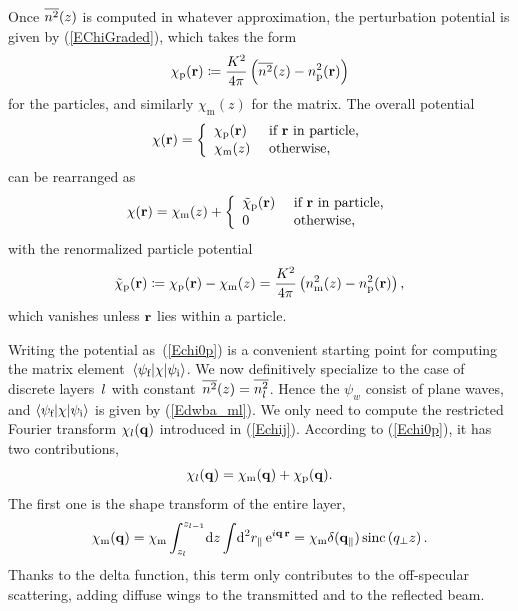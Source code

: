 Once $\overline{n^2}(z)$ is computed in whatever approximation,
the perturbation potential is given by (\ref{EChiGraded}),
which takes the form
\begin{equation}
  \chi_\text{p}(\mathbf{r}) \coloneqq  \frac{K^2}{4\pi}\left(\overline{n^2}(z)-n_\text{p}^2(\mathbf{r})\right)
\end{equation}
for the particles, and similarly $\chi_\text{m}(z)$ for the matrix.
The overall potential
\begin{equation}
  \chi(\mathbf{r})=\left\{\begin{array}{ll}
  \chi_\text{p}(\mathbf{r})&\text{~if $\mathbf{r}$ in particle,}\\[.2ex]
  \chi_\text{m}(z) &\text{~otherwise,} \end{array}\right.
\end{equation}
%
%
can be rearranged as
\begin{equation}\label{Echi0p}
  \chi(\mathbf{r})=\chi_\text{m}(z) + \left\{\begin{array}{ll}
  \tilde\chi_\text{p}(\mathbf{r})&\text{~if $\mathbf{r}$ in particle,}\\[.2ex]
  0 &\text{~otherwise,} \end{array}\right.
\end{equation}
with the renormalized particle potential
\begin{equation}
  \tilde\chi_\text{p}(\mathbf{r})
  \coloneqq  \chi_\text{p}(\mathbf{r})-\chi_\text{m}(z)
  = \frac{K^2}{4\pi}\left(n_\text{m}^2(z)-n_\text{p}^2(\mathbf{r})\right),
\end{equation}
%
which vanishes unless $\mathbf{r}$ lies within a particle.

Writing the potential as~(\ref{Echi0p}) is a convenient starting point
for computing the matrix element~$\left\langle\psi_{\text{f}}|\chi|\psi_{\text{i}}\right\rangle$.
We now definitively specialize to the case of discrete layers~$l$
with constant~$\overline{n^2}(z)=\overline{n_l^2}$.
Hence the $\psi_{w}$ consist of plane waves,
and $\left\langle\psi_{\text{f}}|\chi|\psi_{\text{i}}\right\rangle$ is given by (\ref{Edwba_ml}).
We only need to compute the restricted Fourier transform
$\chi_l(\mathbf{q})$ introduced in (\ref{Echij}).
According to (\ref{Echi0p}),
it has two contributions,
\begin{equation}\label{Echijmp}
  \chi_l(\mathbf{q}) = \chi_\text{m}(\mathbf{q}) + \chi_\text{p}(\mathbf{q}).
\end{equation}
The first one is the shape transform of the entire layer,
\begin{equation}
  \chi_\text{m}(\mathbf{q})
  = \chi_\text{m} \int_{z_l}^{z_{l-1}}\!\text{d} z \int\!\text{d}^2r_\parallel\, \text{e}^{i\mathbf{q}\,\mathbf{r}}
  = \chi_\text{m} \delta(\mathbf{q}_\parallel) \operatorname{sinc}\left( q_\perp z \right).
\end{equation}
Thanks to the delta function,
this term only contributes to the off-specular scattering,
adding diffuse wings to the transmitted and to the reflected beam.

